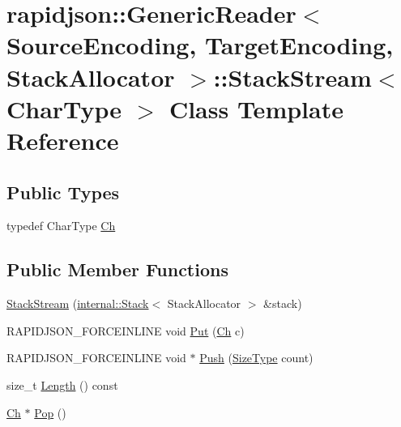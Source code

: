 \hypertarget{classrapidjson_1_1_generic_reader_1_1_stack_stream}{}\section{rapidjson\+::Generic\+Reader$<$ Source\+Encoding, Target\+Encoding, Stack\+Allocator $>$\+::Stack\+Stream$<$ Char\+Type $>$ Class Template Reference}
\label{classrapidjson_1_1_generic_reader_1_1_stack_stream}
\subsection*{Public Types}
\begin{DoxyCompactItemize}
\item 
typedef Char\+Type \mbox{\hyperlink{classrapidjson_1_1_generic_reader_1_1_stack_stream_a26312406aad81ffa8ef6dd01fae42a30}{Ch}}
\end{DoxyCompactItemize}
\subsection*{Public Member Functions}
\begin{DoxyCompactItemize}
\item 
\mbox{\hyperlink{classrapidjson_1_1_generic_reader_1_1_stack_stream_ab1e34ebbc487d5c19bbabe57936afc09}{Stack\+Stream}} (\mbox{\hyperlink{classrapidjson_1_1internal_1_1_stack}{internal\+::\+Stack}}$<$ Stack\+Allocator $>$ \&stack)
\item 
R\+A\+P\+I\+D\+J\+S\+O\+N\+\_\+\+F\+O\+R\+C\+E\+I\+N\+L\+I\+NE void \mbox{\hyperlink{classrapidjson_1_1_generic_reader_1_1_stack_stream_a86be44e7edd2a6afa32325b783d6e0e7}{Put}} (\mbox{\hyperlink{classrapidjson_1_1_generic_reader_1_1_stack_stream_a26312406aad81ffa8ef6dd01fae42a30}{Ch}} c)
\item 
R\+A\+P\+I\+D\+J\+S\+O\+N\+\_\+\+F\+O\+R\+C\+E\+I\+N\+L\+I\+NE void $\ast$ \mbox{\hyperlink{classrapidjson_1_1_generic_reader_1_1_stack_stream_a6831faa6974dd9dee2a10e8df68554c1}{Push}} (\mbox{\hyperlink{namespacerapidjson_a44eb33eaa523e36d466b1ced64b85c84}{Size\+Type}} count)
\item 
size\+\_\+t \mbox{\hyperlink{classrapidjson_1_1_generic_reader_1_1_stack_stream_a8e7a1a66d6602cbe3e290a94d1f99eb8}{Length}} () const
\item 
\mbox{\hyperlink{classrapidjson_1_1_generic_reader_1_1_stack_stream_a26312406aad81ffa8ef6dd01fae42a30}{Ch}} $\ast$ \mbox{\hyperlink{classrapidjson_1_1_generic_reader_1_1_stack_stream_a0d0f7dc8727ab44301ea697563068a19}{Pop}} ()
\end{DoxyCompactItemize}
